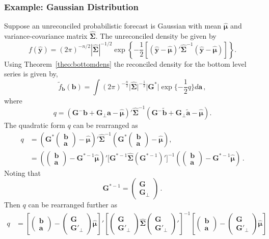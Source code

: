 \documentclass[12pt]{article}
\def\PQ{\begin{pmatrix}\bm{G}\\[-0.2cm]\bm{G}'_{\perp}\end{pmatrix}}
\def\bt{\begin{pmatrix}{\bm{b}}\\[-0.2cm]{\bm{a}}\end{pmatrix}}
\theoremstyle{definition}
\begin{document}
\subsubsection*{Example: Gaussian Distribution}

Suppose an unreconciled probabilistic forecast is Gaussian with mean $\hat{\bm{\mu}}$ and variance-covariance matrix $\hat{\bm{\Sigma}}$. The unreconciled density be given by
\begin{equation}
f(\hat{\bm{y}})=(2\pi)^{-n/2}|\hat{\bm{\Sigma}}|^{-1/2}\exp\left\{-\frac{1}{2}\left[(\hat{\bm{y}}-\hat{\bm{\mu}})'\hat{\bm{\Sigma}}^{-1}(\hat{\bm{y}}-\hat{\bm{\mu}})\right]\right\}.
\end{equation}
Using Theorem~\ref{theo:bottomdens} the reconciled density for the bottom level series is given by,
\begin{equation}
\tilde{f}_{\bm{b}}(\bm{b})=\int(2\pi)^{-\frac{n}{2}}\Big|\hat{\bm{\Sigma}}\Big|^{-\frac{1}{2}}\Big|\bm{G^*}|\exp\{-\frac{1}{2}q\}d{\bm a}\,,
\end{equation}
where
\begin{equation}
q=(\bm{G}^-{\bm{b}}+\bm{G}_{\perp}{\bm{a}}-\hat{\bm{\mu}})' \hat{\bm{\Sigma}}^{-1}(\bm{G}^-\tilde{\bm{b}}+\bm{G}_\perp\tilde{\bm{a}}-\hat{\bm{\mu}}).
\end{equation}
The quadratic form $q$ can be rearranged as
\begin{align*}
	q& =
	\left(\bm{G}^*\bt-\hat{\bm{\mu}}\right)' \hat{\bm{\Sigma}}^{-1}\left(\bm{G}^*\bt-\hat{\bm{\mu}}\right),\\
	& =
	\left(\bt-\bm{G}^{*-1}\hat{\bm{\mu}}\right)' \Big[\bm{G}^{*-1}\hat{\bm{\Sigma}}\left(\bm{G}^{*-1}\right)'\Big]^{-1}
	\left(\bt-\bm{G}^{*-1}\hat{\bm{\mu}}\right)\,.
\end{align*}
Noting that
\[
\bm{G}^{*-1} =
\begin{pmatrix}
\bm{G} \\\bm{G}_{\perp}
\end{pmatrix}\,.
\]
Then $q$ can be rearranged further as
\begin{align*}
	q& =%
	\left[\bt-\PQ\hat{\bm{\mu}}\right]'%
	\left[\PQ\hat{\bm{\Sigma}}\PQ'\right]^{-1}\left[\bt-\PQ\hat{\bm{\mu}}\right] %
\end{align*}
\end{document}
